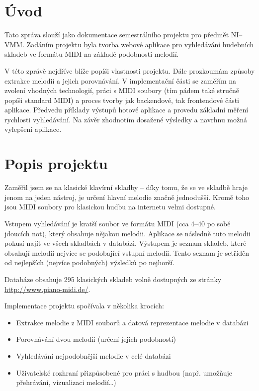 \section{Úvod}
Tato zpráva slouží jako dokumentace semestrálního projektu pro předmět NI--VMM. Zadáním projektu byla tvorba webové aplikace pro vyhledávání hudebních skladeb ve formátu MIDI na základě podobnosti melodií.

V této zprávě nejdříve blíže popíši vlastnosti projektu. Dále prozkoumám způsoby extrakce melodií a jejich porovnávání. V implementační části se zaměřím na zvolení vhodných technologií, práci s MIDI soubory (tím pádem také stručně popíši standard MIDI) a proces tvorby jak backendové, tak frontendové části aplikace. Předvedu příklady výstupů hotové aplikace a provedu základní měření rychlosti vyhledávání. Na závěr zhodnotím dosažené výsledky a navrhnu možná vylepšení aplikace.

\pagebreak
\section{Popis projektu}
Zaměřil jsem se na klasické klavírní skladby -- díky tomu, že se ve skladbě hraje jenom na jeden nástroj, je určení hlavní melodie značně jednodušší. Kromě toho jsou MIDI soubory pro klasickou hudbu na internetu velmi dostupné.

Vstupem vyhledávání je kratší soubor ve formátu MIDI (cca 4--40 po sobě jdoucích not), který obsahuje nějakou melodii. Aplikace se následně tuto melodii pokusí najít ve všech skladbách v databázi. Výstupem je seznam skladeb, které obsahují melodii nejvíce se podobající vstupní melodii. Tento seznam je setříděn od nejlepších (nejvíce podobných) výsledků po nejhorší.

Databáze obsahuje 295 klasických skladeb volně dostupných ze stránky \url{http://www.piano-midi.de/}.

Implementace projektu spočívala v několika krocích:
\begin{itemize}
    \item Extrakce melodie z MIDI souborů a datová reprezentace melodie v databázi
    \item Porovnávání dvou melodií (určení jejich podobnosti)
    \item Vyhledávání nejpodobnější melodie v celé databázi
    \item Uživatelské rozhraní přizpůsobené pro práci s hudbou (např. umožňuje přehrávání, vizualizaci melodií\ldots)
\end{itemize}

